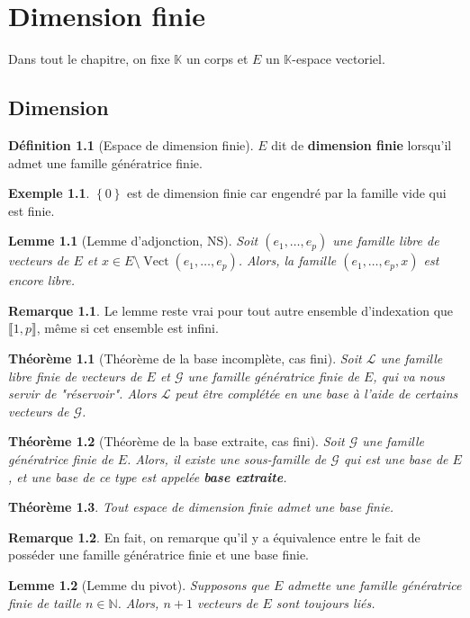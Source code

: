 \documentclass[french]{book}
\newcommand{\N}{\mathbb{N}}
\newcommand{\K}{\mathbb{K}}
\theoremstyle{plain}
\newtheorem{thm}{Théorème}[chapter]
\newtheorem{lem}{Lemme}[chapter]
\theoremstyle{definition}
\newtheorem{dfn}{Définition}[chapter]
\newtheorem{exa}{Exemple}[chapter]
\newtheorem{rmq}{Remarque}[chapter]
\theoremstyle{remark}
\DeclareMathOperator{\vect}{Vect}
\begin{document}
\chapter{Dimension finie} %
Dans tout le chapitre, on fixe $\K$ un corps et $E$ un $\K$-espace vectoriel.
\section{Dimension}
\begin{dfn}[Espace de dimension finie]
	$E$ dit de \textbf{dimension finie} lorsqu'il admet une famille génératrice finie.
\end{dfn}
\begin{exa}
	$\left\{0\right\}$ est de dimension finie car engendré par la famille vide qui est finie.
\end{exa}
\begin{lem}[Lemme d'adjonction, NS]
	Soit $(e_1,\ldots,e_p)$ une famille libre de vecteurs de $E$ et $x\in E\setminus\vect(e_1,\ldots,e_p)$. Alors, la famille $(e_1,\ldots,e_p,x)$ est encore libre.
\end{lem}
\begin{rmq}
	Le lemme reste vrai pour tout autre ensemble d'indexation que $\llbracket1,p\rrbracket$, même si cet ensemble est infini.
\end{rmq}
\begin{thm}[Théorème de la base incomplète, cas fini]
	Soit $\mathcal{L}$ une famille libre finie de vecteurs de $E$ et $\mathcal{G}$ une famille génératrice finie de $E$, qui va nous servir de "réservoir". Alors $\mathcal{L}$ peut être complétée en une base à l'aide de certains vecteurs de $\mathcal{G}$. 
\end{thm}
\begin{thm}[Théorème de la base extraite, cas fini]
	Soit $\mathcal{G}$ une famille génératrice finie de $E$. Alors, il existe une sous-famille de $\mathcal{G}$ qui est une base de $E$, et une base de ce type est appelée \textbf{base extraite}.
\end{thm}
\begin{thm}
	Tout espace de dimension finie admet une base finie.
\end{thm}
\begin{rmq}
	En fait, on remarque qu'il y a équivalence entre le fait de posséder une famille génératrice finie et une base finie.
\end{rmq}
\begin{lem}[Lemme du pivot]
	Supposons que $E$ admette une famille génératrice finie de taille $n\in\N$. Alors, $n+1$ vecteurs de $E$ sont toujours liés.
\end{lem}
\end{document}

